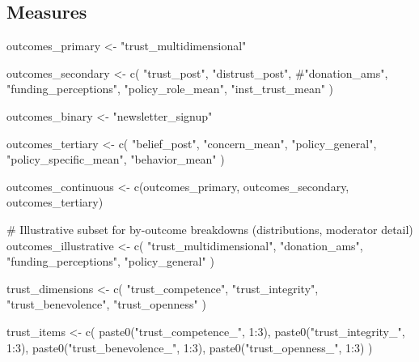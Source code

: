 \documentclass[
  letterpaper,
  DIV=11,
  numbers=noendperiod]{scrartcl}
\newenvironment{Shaded}{\begin{snugshade}}{\end{snugshade}}
\newcommand{\CommentTok}[1]{\textcolor[rgb]{0.37,0.37,0.37}{#1}}
\newcommand{\DecValTok}[1]{\textcolor[rgb]{0.68,0.00,0.00}{#1}}
\newcommand{\FunctionTok}[1]{\textcolor[rgb]{0.28,0.35,0.67}{#1}}
\newcommand{\NormalTok}[1]{\textcolor[rgb]{0.00,0.23,0.31}{#1}}
\newcommand{\OtherTok}[1]{\textcolor[rgb]{0.00,0.23,0.31}{#1}}
\newcommand{\SpecialCharTok}[1]{\textcolor[rgb]{0.37,0.37,0.37}{#1}}
\newcommand{\StringTok}[1]{\textcolor[rgb]{0.13,0.47,0.30}{#1}}
\begin{document}
\subsection{Measures}\label{measures}

\begin{Shaded}
\begin{Highlighting}[]
\NormalTok{outcomes\_primary }\OtherTok{\textless{}{-}} \StringTok{"trust\_multidimensional"}

\NormalTok{outcomes\_secondary }\OtherTok{\textless{}{-}} \FunctionTok{c}\NormalTok{(}
  \StringTok{"trust\_post"}\NormalTok{, }\StringTok{"distrust\_post"}\NormalTok{, }
  \CommentTok{\#"donation\_ams",}
  \StringTok{"funding\_perceptions"}\NormalTok{, }\StringTok{"policy\_role\_mean"}\NormalTok{, }\StringTok{"inst\_trust\_mean"}
\NormalTok{)}

\NormalTok{outcomes\_binary }\OtherTok{\textless{}{-}} \StringTok{"newsletter\_signup"}

\NormalTok{outcomes\_tertiary }\OtherTok{\textless{}{-}} \FunctionTok{c}\NormalTok{(}
  \StringTok{"belief\_post"}\NormalTok{, }\StringTok{"concern\_mean"}\NormalTok{, }\StringTok{"policy\_general"}\NormalTok{,}
  \StringTok{"policy\_specific\_mean"}\NormalTok{, }\StringTok{"behavior\_mean"}
\NormalTok{)}

\NormalTok{outcomes\_continuous }\OtherTok{\textless{}{-}} \FunctionTok{c}\NormalTok{(outcomes\_primary, outcomes\_secondary, outcomes\_tertiary)}

\CommentTok{\# Illustrative subset for by{-}outcome breakdowns (distributions, moderator detail)}
\NormalTok{outcomes\_illustrative }\OtherTok{\textless{}{-}} \FunctionTok{c}\NormalTok{(}
  \StringTok{"trust\_multidimensional"}\NormalTok{,}
  \StringTok{"donation\_ams"}\NormalTok{,}
  \StringTok{"funding\_perceptions"}\NormalTok{,}
  \StringTok{"policy\_general"}
\NormalTok{)}

\NormalTok{trust\_dimensions }\OtherTok{\textless{}{-}} \FunctionTok{c}\NormalTok{(}
  \StringTok{"trust\_competence"}\NormalTok{, }\StringTok{"trust\_integrity"}\NormalTok{, }\StringTok{"trust\_benevolence"}\NormalTok{, }\StringTok{"trust\_openness"}
\NormalTok{)}

\NormalTok{trust\_items }\OtherTok{\textless{}{-}} \FunctionTok{c}\NormalTok{(}
  \FunctionTok{paste0}\NormalTok{(}\StringTok{"trust\_competence\_"}\NormalTok{,  }\DecValTok{1}\SpecialCharTok{:}\DecValTok{3}\NormalTok{),}
  \FunctionTok{paste0}\NormalTok{(}\StringTok{"trust\_integrity\_"}\NormalTok{,   }\DecValTok{1}\SpecialCharTok{:}\DecValTok{3}\NormalTok{),}
  \FunctionTok{paste0}\NormalTok{(}\StringTok{"trust\_benevolence\_"}\NormalTok{, }\DecValTok{1}\SpecialCharTok{:}\DecValTok{3}\NormalTok{),}
  \FunctionTok{paste0}\NormalTok{(}\StringTok{"trust\_openness\_"}\NormalTok{,    }\DecValTok{1}\SpecialCharTok{:}\DecValTok{3}\NormalTok{)}
\NormalTok{)}


\end{Highlighting}
\end{Shaded}
\end{document}
